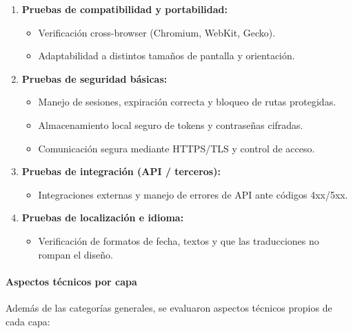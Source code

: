 \documentclass[12pt, atypical, journal]{article}
\begin{document}
\begin{enumerate}
\begin{itemize}
    \end{itemize}
    \item \textbf{Pruebas de compatibilidad y portabilidad:}
    \begin{itemize}
        \item Verificación cross-browser (Chromium, WebKit, Gecko).
        \item Adaptabilidad a distintos tamaños de pantalla y orientación.
    \end{itemize}
    \item \textbf{Pruebas de seguridad básicas:}
    \begin{itemize}
        \item Manejo de sesiones, expiración correcta y bloqueo de rutas protegidas.
        \item Almacenamiento local seguro de tokens y contraseñas cifradas.
        \item Comunicación segura mediante HTTPS/TLS y control de acceso.
    \end{itemize}
    \item \textbf{Pruebas de integración (API / terceros):}
    \begin{itemize}
        \item Integraciones externas y manejo de errores de API ante códigos 4xx/5xx.
    \end{itemize}
    \item \textbf{Pruebas de localización e idioma:}
    \begin{itemize}
        \item Verificación de formatos de fecha, textos y que las traducciones no rompan el diseño.
    \end{itemize}
\end{enumerate}

\paragraph{Aspectos técnicos por capa}
Además de las categorías generales, se evaluaron aspectos técnicos propios de cada capa:
\end{document}
